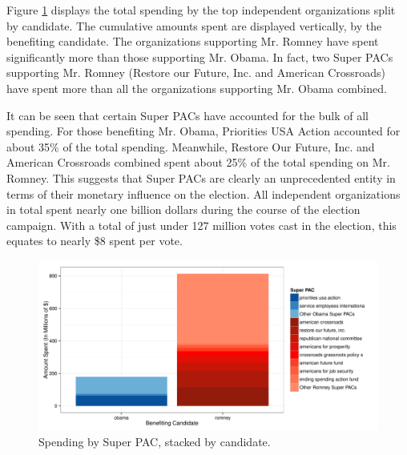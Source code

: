 \documentclass[11pt]{article}\usepackage{graphicx, color}
\newenvironment{knitrout}{}{} %
\begin{document}
Figure \ref{fig:PAC_plot} displays the total spending by the top independent organizations split by candidate. The cumulative amounts spent are displayed vertically, by the benefiting candidate. The organizations supporting Mr. Romney have spent significantly more than those supporting Mr. Obama. In fact, two Super PACs supporting Mr. Romney (Restore our Future, Inc. and American Crossroads) have spent more than all the organizations supporting Mr. Obama combined.

It can be seen that certain Super PACs have accounted for the bulk of all spending. For those benefiting Mr. Obama, Priorities USA Action accounted for about 35\% of the total spending. Meanwhile, Restore Our Future, Inc. and American Crossroads combined spent about 25\% of the total spending on Mr. Romney. This suggests that Super PACs are clearly an unprecedented entity in terms of their monetary influence on the election. All independent organizations in total spent nearly one billion dollars during the course of the election campaign. With a total of just under 127 million votes cast in the election, this equates to nearly \$8 spent per vote.

\begin{knitrout}
\color{fgcolor}\begin{figure}[H]


{\centering \includegraphics[width=\textwidth]{figure/PAC_plot} 

}

\caption[Spending by Super PAC, stacked by candidate]{Spending by Super PAC, stacked by candidate.\label{fig:PAC_plot}}
\end{figure}


\end{knitrout}
\end{document}
